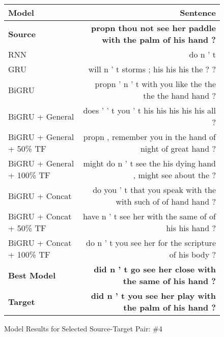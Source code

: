 \documentclass[twoside,twocolumn]{article}
\newlength\mystoreparindent
\newenvironment{myparindent}[1]{%
  \setlength{\mystoreparindent}{\the\parindent}
  \setlength{\parindent}{#1}
  }{%
  \setlength{\parindent}{\mystoreparindent}
}
\begin{document}
\begin{myparindent}{0pt}
\begin{figure}[ht!]
    \centering
    \begin{tabular}{ |l|r| }
        \hline
        \textbf{Model}
          & \textbf{Sentence} \\
        \hline
        \textbf{Source} & \textbf{propn thou not see her paddle with the palm of his hand ?} \\ \hline
        RNN & do n ' t \\ \hline
        GRU & will n ' t storms ; his his his the ? ? \\ \hline
        BiGRU & propn ' n ' t with you like the the the the hand hand ? \\ \hline
        BiGRU + General & does ’ ’ t you ’ t his his his his his all ? \\ \hline
        BiGRU + General + 50\% TF & propn , remember you in the hand of night of great hand ? \\ \hline
        BiGRU + General + 100\% TF & might do n ’ t see the his dying hand , might see about the ? \\ \hline
        BiGRU + Concat & do you ' t that you speak with the with such of of hand hand ? \\ \hline
        BiGRU + Concat + 50\% TF & have n ' t see her with the same of of his his hand ? \\ \hline
        BiGRU + Concat + 100\% TF & do n ' t you see her for the scripture of his body ? \\ \hline
        \textbf{Best Model} & \textbf{did n ' t go see her close with the same of his hand ?} \\ \hline
        \textbf{Target} & \textbf{did n ’ t you see her play with the palm of his hand ?} \\ \hline
    \end{tabular}
    \caption{Model Results for Selected Source-Target Pair: \#4}
    \label{fig:model-results-4}
\end{figure}


\end{myparindent}
\end{document}
